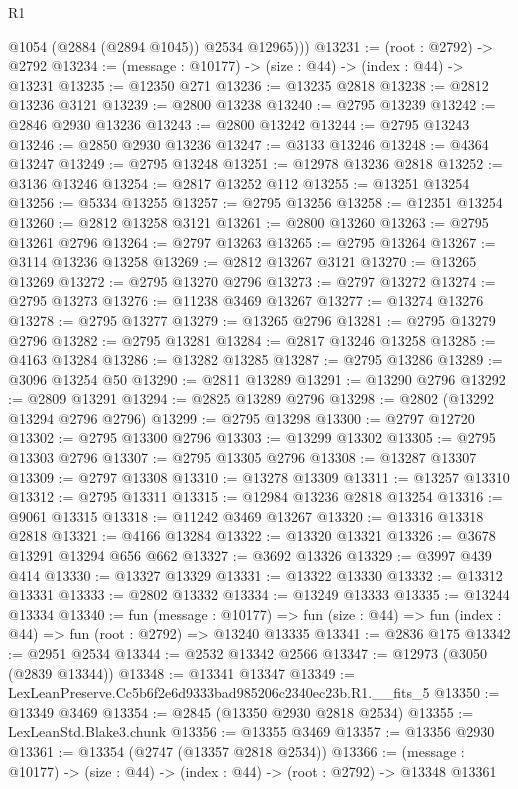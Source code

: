 \begin{lexlean}{R1}
\begin{coremodule}
          @1054
          (@2884 (@2894 @1045))
          @2534
          @12965)))
@13231 := (root : @2792) -> @2792
@13234 := (message : @10177) -> (size : @44) -> (index : @44) -> @13231
@13235 := @12350 @271
@13236 := @13235 @2818
@13238 := @2812 @13236 @3121
@13239 := @2800 @13238
@13240 := @2795 @13239
@13242 := @2846 @2930 @13236
@13243 := @2800 @13242
@13244 := @2795 @13243
@13246 := @2850 @2930 @13236
@13247 := @3133 @13246
@13248 := @4364 @13247
@13249 := @2795 @13248
@13251 := @12978 @13236 @2818
@13252 := @3136 @13246
@13254 := @2817 @13252 @112
@13255 := @13251 @13254
@13256 := @5334 @13255
@13257 := @2795 @13256
@13258 := @12351 @13254
@13260 := @2812 @13258 @3121
@13261 := @2800 @13260
@13263 := @2795 @13261 @2796
@13264 := @2797 @13263
@13265 := @2795 @13264
@13267 := @3114 @13236 @13258
@13269 := @2812 @13267 @3121
@13270 := @13265 @13269
@13272 := @2795 @13270 @2796
@13273 := @2797 @13272
@13274 := @2795 @13273
@13276 := @11238 @3469 @13267
@13277 := @13274 @13276
@13278 := @2795 @13277
@13279 := @13265 @2796
@13281 := @2795 @13279 @2796
@13282 := @2795 @13281
@13284 := @2817 @13246 @13258
@13285 := @4163 @13284
@13286 := @13282 @13285
@13287 := @2795 @13286
@13289 := @3096 @13254 @50
@13290 := @2811 @13289
@13291 := @13290 @2796
@13292 := @2809 @13291
@13294 := @2825 @13289 @2796
@13298 := @2802 (@13292 @13294 @2796 @2796)
@13299 := @2795 @13298
@13300 := @2797 @12720
@13302 := @2795 @13300 @2796
@13303 := @13299 @13302
@13305 := @2795 @13303 @2796
@13307 := @2795 @13305 @2796
@13308 := @13287 @13307
@13309 := @2797 @13308
@13310 := @13278 @13309
@13311 := @13257 @13310
@13312 := @2795 @13311
@13315 := @12984 @13236 @2818 @13254
@13316 := @9061 @13315
@13318 := @11242 @3469 @13267
@13320 := @13316 @13318 @2818
@13321 := @4166 @13284
@13322 := @13320 @13321
@13326 := @3678 @13291 @13294 @656 @662
@13327 := @3692 @13326
@13329 := @3997 @439 @414
@13330 := @13327 @13329
@13331 := @13322 @13330
@13332 := @13312 @13331
@13333 := @2802 @13332
@13334 := @13249 @13333
@13335 := @13244 @13334
@13340 := fun (message : @10177) =>
  fun (size : @44) => fun (index : @44) => fun (root : @2792) => @13240 @13335
@13341 := @2836 @175
@13342 := @2951 @2534
@13344 := @2532 @13342 @2566
@13347 := @12973 (@3050 (@2839 @13344))
@13348 := @13341 @13347
@13349 := LexLeanPreserve.Cc5b6f2e6d9333bad985206c2340ec23b.R1.__fits_5
@13350 := @13349 @3469
@13354 := @2845 (@13350 @2930 @2818 @2534)
@13355 := LexLeanStd.Blake3.chunk
@13356 := @13355 @3469
@13357 := @13356 @2930
@13361 := @13354 (@2747 (@13357 @2818 @2534))
@13366 := (message : @10177) -> (size : @44) -> (index : @44) -> (root : @2792) -> @13348 @13361

\end{coremodule}
\end{lexlean}

